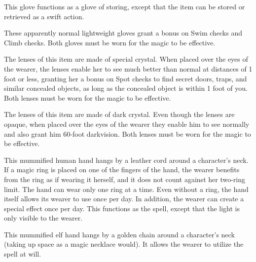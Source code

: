  This glove functions as a glove of storing, except that the item can be stored or retrieved as a swift action.

 These apparently normal lightweight gloves grant a   bonus on Swim checks and Climb checks. Both gloves must be worn for the magic to be effective.

 The lenses of this item are made of special crystal. When placed over the eyes of the wearer, the lenses enable her to see much better than normal at distances of 1 foot or less, granting her a   bonus on Spot checks to find secret doors, traps, and similar concealed objects, as long as the concealed object is within 1 foot of you. Both lenses must be worn for the magic to be effective.

 The lenses of this item are made of dark crystal. Even though the lenses are opaque, when placed over the eyes of the wearer they enable him to see normally and also grant him 60-foot darkvision. Both lenses must be worn for the magic to be effective.

 This mummified human hand hangs by a leather cord around a character's neck. If a magic ring is placed on one of the fingers of the hand, the wearer benefits from the ring as if wearing it herself, and it does not count against her two-ring limit. The hand can wear only one ring at a time. Even without a ring, the hand itself allows its wearer to use  once per day. In addition, the wearer can create a special  effect once per day. This functions as the  spell, except that the light is only visible to the wearer.

 This mummified elf hand hangs by a golden chain around a character's neck (taking up space as a magic necklace would). It allows the wearer to utilize the spell  at will.

